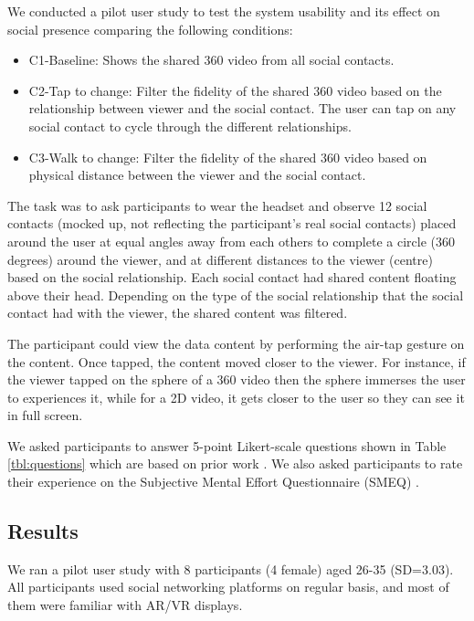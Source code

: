 We conducted a pilot user study to test the system usability and its effect on social presence comparing the following conditions: 

\begin{itemize}
\item C1-Baseline: Shows the shared 360 video from all social contacts.
\item C2-Tap to change: Filter the fidelity of the shared 360 video based on the relationship between viewer and the social contact. The user can tap on any social contact to cycle through the different relationships.
\item C3-Walk to change: Filter the fidelity of the shared 360 video based on physical distance between the viewer and the social contact.
\end{itemize}

The task was to ask participants to wear the headset and observe 12 social contacts (mocked up, not reflecting the participant's real social contacts) placed around the user at equal angles away from each others to complete a circle (360 degrees) around the viewer, and at different distances to the viewer (centre)  based on the social relationship. 
Each social contact had shared content floating above their head. Depending on the type of the social relationship that the social contact had with the viewer, the shared content was filtered. 

The participant could view the data content by performing the air-tap gesture on the content. Once tapped, the content moved closer to the viewer. For instance, if the viewer tapped on the sphere of a 360 video then the sphere immerses the user to experiences it, while for a 2D video, it gets closer to the user so they can see it in full screen.

We asked participants to answer 5-point Likert-scale questions shown in Table \ref{tbl:questions} which are based on prior work \cite{Biocca2003}. We also asked participants to rate their experience on the Subjective Mental Effort Questionnaire (SMEQ) \cite{Sauro2009}. 

\subsection{Results}

We ran a pilot user study with 8 participants (4 female) aged 26-35 (SD=3.03). All participants used social networking platforms on regular basis, and most of them were familiar with AR/VR displays. 

